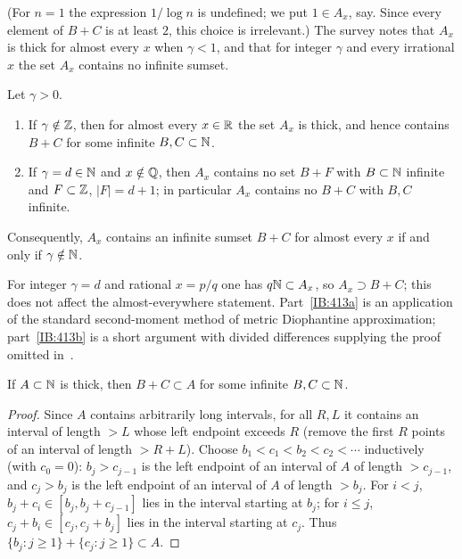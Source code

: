 (For $n=1$ the expression $1/\log n$ is undefined; we put $1\in A_x$, say. Since every
element of $B+C$ is at least $2$, this choice is irrelevant.) The survey notes that $A_x$ is thick for almost
every $x$ when $\gamma<1$, and that for integer $\gamma$ and every irrational $x$ the
set $A_x$ contains no infinite sumset.

\begin{theorem}
\label{IB:thm:413}
Let $\gamma>0$.
\begin{enumerate}[label=\textup{(\alph*)}]
\item\label{IB:413a} If $\gamma\notin\mathbb{Z}$, then for almost every $x\in\mathbb{R}$ the set $A_x$ is
thick, and hence contains $B+C$ for some infinite $B,C\subset\mathbb{N}$.
\item\label{IB:413b} If $\gamma=d\in\mathbb{N}$ and $x\notin\mathbb{Q}$, then $A_x$ contains no set $B+F$
with $B\subset\mathbb{N}$ infinite and $F\subset\mathbb{Z}$, $|F|=d+1$; in particular $A_x$ contains no
$B+C$ with $B,C$ infinite.
\end{enumerate}
Consequently, $A_x$ contains an infinite sumset $B+C$ for almost every $x$ if and
only if $\gamma\notin\mathbb{N}$.
\end{theorem}

For integer $\gamma=d$ and rational $x=p/q$ one has $q\mathbb{N}\subset A_x$, so $A_x\supset B+C$;
this does not affect the almost-everywhere statement. Part~\ref{IB:413a} is an
application of the standard second-moment method of metric Diophantine
approximation; part~\ref{IB:413b} is a short argument with divided differences
supplying the proof omitted in~\cite{kra2023problems}.

\begin{lemma}
\label{IB:lem:thick}
If $A\subset\mathbb{N}$ is thick, then $B+C\subset A$ for some infinite $B,C\subset\mathbb{N}$.
\end{lemma}

\begin{proof}
Since $A$ contains arbitrarily long intervals, for all $R,L$ it contains an interval of length
$>L$ whose left endpoint exceeds $R$ (remove the first $R$ points of an interval of length
$>R+L$). Choose $b_1<c_1<b_2<c_2<\cdots$ inductively (with $c_0=0$): $b_j>c_{j-1}$ is the left
endpoint of an interval of $A$ of length $>c_{j-1}$, and $c_j>b_j$ is the left
endpoint of an interval of $A$ of length $>b_j$. For $i<j$, $b_j+c_i\in[b_j,b_j+c_{j-1}]$
lies in the interval starting at $b_j$; for $i\le j$, $c_j+b_i\in[c_j,c_j+b_j]$ lies in
the interval starting at $c_j$. Thus $\{b_j:j\ge1\}+\{c_j:j\ge1\}\subset A$.
\end{proof}

